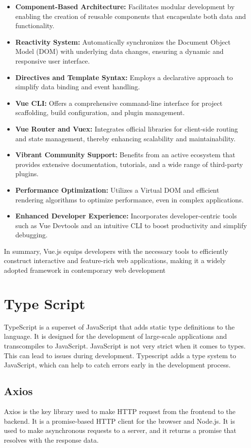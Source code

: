 \begin{itemize}
    \item \textbf{Component-Based Architecture:} Facilitates modular development by enabling the creation of reusable components that encapsulate both data and functionality.
    \item \textbf{Reactivity System:} Automatically synchronizes the Document Object Model (DOM) with underlying data changes, ensuring a dynamic and responsive user interface.
    \item \textbf{Directives and Template Syntax:} Employs a declarative approach to simplify data binding and event handling.
    \item \textbf{Vue CLI:} Offers a comprehensive command-line interface for project scaffolding, build configuration, and plugin management.
    \item \textbf{Vue Router and Vuex:} Integrates official libraries for client-side routing and state management, thereby enhancing scalability and maintainability.
    \item \textbf{Vibrant Community Support:} Benefits from an active ecosystem that provides extensive documentation, tutorials, and a wide range of third-party plugins.
    \item \textbf{Performance Optimization:} Utilizes a Virtual DOM and efficient rendering algorithms to optimize performance, even in complex applications.
    \item \textbf{Enhanced Developer Experience:} Incorporates developer-centric tools such as Vue Devtools and an intuitive CLI to boost productivity and simplify debugging.
\end{itemize}

In summary, Vue.js equips developers with the necessary tools to efficiently construct interactive and feature-rich web applications, making it a widely adopted framework in contemporary web development 
\cite{vuejs_docs}

\section{Type Script}
\label{sec:TypeScript}

TypeScript is a superset of JavaScript that adds static type definitions to the language. It is designed for the development of large-scale applications and transcompiles to JavaScript.
JavaScript is not very strict when it comes to types. This can lead to issues during development. Typescript adds a type system to JavaScript, which can help to catch errors early in the development process.



\subsection{Axios}
Axios is the key library used to make HTTP request from the frontend to the backend. It is a promise-based HTTP client for the browser and Node.js. It is used to make asynchronous requests to a server, and it returns a promise that resolves with the response data. 
\cite{axios_docs}

